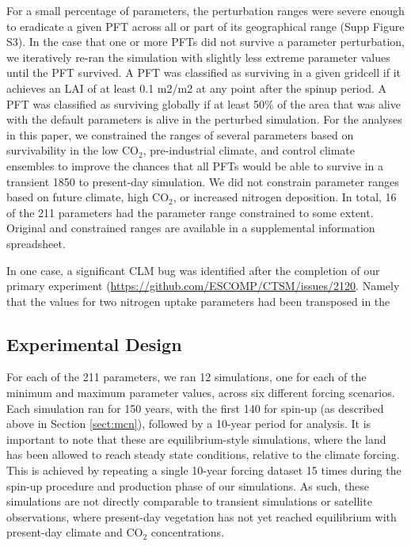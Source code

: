 \documentclass[draft]{agujournal2019}
\begin{document}
For a small percentage of parameters, the perturbation ranges were severe enough to eradicate a given PFT across all or part of its geographical range (Supp Figure S3). In the case that one or more PFTs did not survive a parameter perturbation, we iteratively re-ran the simulation with slightly less extreme parameter values until the PFT survived. A PFT was classified as surviving in a given gridcell if it achieves an LAI of at least 0.1 m2/m2 at any point after the spinup period. A PFT was classified as surviving globally if at least 50\% of the area that
was alive with the default parameters is alive in the perturbed simulation. For the analyses in this paper, we constrained the ranges of several parameters based on survivability in the low CO$_2$, pre-industrial climate, and control climate ensembles to improve the chances that all PFTs would be able to survive in a transient 1850 to present-day simulation. We did not constrain parameter ranges based on future climate, high CO$_2
$, or increased nitrogen deposition. In total, 16 of the 211 parameters had the parameter range constrained to some extent. Original and constrained ranges are available in a supplemental information spreadsheet.

In one case, a significant CLM bug was identified after the completion of our primary experiment (\url{https://github.com/ESCOMP/CTSM/issues/2120}. Namely that the values for two nitrogen uptake parameters had been transposed in the 

\subsection{Experimental Design}
\label{sect:exp}
For each of the 211 parameters, we ran 12 simulations, one for each of the minimum and maximum parameter values, across six different forcing scenarios. Each simulation ran for 150 years, with the first 140 for spin-up (as described above in Section \ref{sect:mcn}), followed by a 10-year period for analysis. It is important to note that these are equilibrium-style simulations, where the land has been allowed to reach steady state conditions, relative to the climate forcing. This is achieved by repeating a single 10-year forcing dataset 15 times during the spin-up procedure and production phase of our simulations. As such, these simulations are not directly comparable to transient simulations or satellite observations, where present-day vegetation has not yet reached equilibrium with present-day climate and CO$_2$ concentrations.
\end{document}
